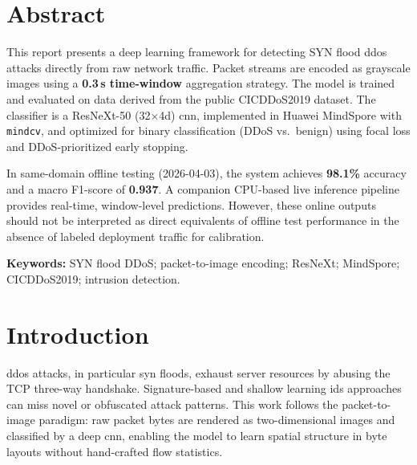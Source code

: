\indent
{}
\newpage
\chapter*{Abstract}
This report presents a deep learning framework for detecting SYN flood
\gls{ddos} attacks directly from raw network traffic. Packet streams are
encoded as grayscale images using a \textbf{0.3\,s time-window} aggregation
strategy. The model is trained and evaluated on data derived from the public
CICDDoS2019 dataset. The classifier is a
ResNeXt-50 (32$\times$4d) \gls{cnn}, implemented in Huawei MindSpore with
\mbox{\texttt{mindcv}}, and optimized for binary classification (DDoS vs.\ benign)
using focal loss and DDoS-prioritized early stopping.

In same-domain offline testing (2026-04-03), the system achieves
\textbf{98.1\%} accuracy and a macro F1-score of \textbf{0.937}. A companion
CPU-based live inference pipeline provides real-time, window-level
predictions. However, these online outputs should not be interpreted as direct
equivalents of offline test performance in the absence of labeled deployment
traffic for calibration.

\vspace{1em}
\noindent\textbf{Keywords:} SYN flood DDoS; packet-to-image encoding; ResNeXt; MindSpore; \mbox{CICDDoS2019}; intrusion detection.

\newpage
\tableofcontents
\newpage
\listoftables
{}
\newpage
\listoffigures
{}
\newpage
\listofequation
{}
\newpage
{}
{}
\printglossary[title={List of Abbreviations},type=\acronymtype,nonumberlist]

\newpage
{}



\chapter{Introduction}

\Gls{ddos} attacks, in particular \gls{syn} floods, exhaust server resources by
abusing the TCP three-way handshake. Signature-based and shallow learning
\gls{ids} approaches can miss novel or obfuscated attack patterns. This work
follows the packet-to-image paradigm: raw packet bytes are rendered as
two-dimensional images and classified by a deep \gls{cnn}, enabling the model to
learn spatial structure in byte layouts without hand-crafted flow statistics.

